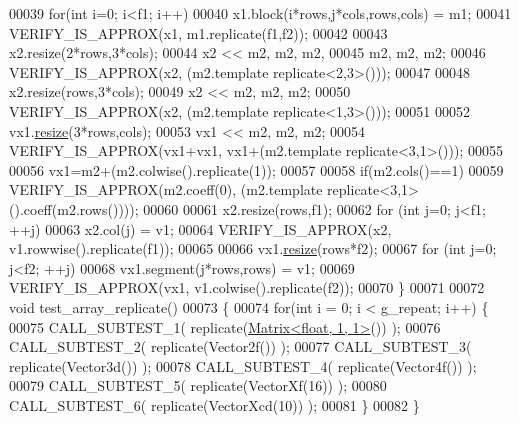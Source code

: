 \begin{DoxyCode}
00039   \textcolor{keywordflow}{for}(\textcolor{keywordtype}{int} i=0; i<f1; i++)
00040     x1.block(i*rows,j*cols,rows,cols) = m1;
00041   VERIFY\_IS\_APPROX(x1, m1.replicate(f1,f2));
00042 
00043   x2.resize(2*rows,3*cols);
00044   x2 << m2, m2, m2,
00045         m2, m2, m2;
00046   VERIFY\_IS\_APPROX(x2, (m2.template replicate<2,3>()));
00047   
00048   x2.resize(rows,3*cols);
00049   x2 << m2, m2, m2;
00050   VERIFY\_IS\_APPROX(x2, (m2.template replicate<1,3>()));
00051   
00052   vx1.\hyperlink{class_eigen_1_1_plain_object_base_a99d9054ee2d5a40c6e00ded0265e9cea}{resize}(3*rows,cols);
00053   vx1 << m2, m2, m2;
00054   VERIFY\_IS\_APPROX(vx1+vx1, vx1+(m2.template replicate<3,1>()));
00055   
00056   vx1=m2+(m2.colwise().replicate(1));
00057   
00058   \textcolor{keywordflow}{if}(m2.cols()==1)
00059     VERIFY\_IS\_APPROX(m2.coeff(0), (m2.template replicate<3,1>().coeff(m2.rows())));
00060 
00061   x2.resize(rows,f1);
00062   \textcolor{keywordflow}{for} (\textcolor{keywordtype}{int} j=0; j<f1; ++j)
00063     x2.col(j) = v1;
00064   VERIFY\_IS\_APPROX(x2, v1.rowwise().replicate(f1));
00065 
00066   vx1.\hyperlink{class_eigen_1_1_plain_object_base_a99d9054ee2d5a40c6e00ded0265e9cea}{resize}(rows*f2);
00067   \textcolor{keywordflow}{for} (\textcolor{keywordtype}{int} j=0; j<f2; ++j)
00068     vx1.segment(j*rows,rows) = v1;
00069   VERIFY\_IS\_APPROX(vx1, v1.colwise().replicate(f2));
00070 \}
00071 
00072 \textcolor{keywordtype}{void} test\_array\_replicate()
00073 \{
00074   \textcolor{keywordflow}{for}(\textcolor{keywordtype}{int} i = 0; i < g\_repeat; i++) \{
00075     CALL\_SUBTEST\_1( replicate(\hyperlink{group___core___module_class_eigen_1_1_matrix}{Matrix<float, 1, 1>}()) );
00076     CALL\_SUBTEST\_2( replicate(Vector2f()) );
00077     CALL\_SUBTEST\_3( replicate(Vector3d()) );
00078     CALL\_SUBTEST\_4( replicate(Vector4f()) );
00079     CALL\_SUBTEST\_5( replicate(VectorXf(16)) );
00080     CALL\_SUBTEST\_6( replicate(VectorXcd(10)) );
00081   \}
00082 \}
\end{DoxyCode}
